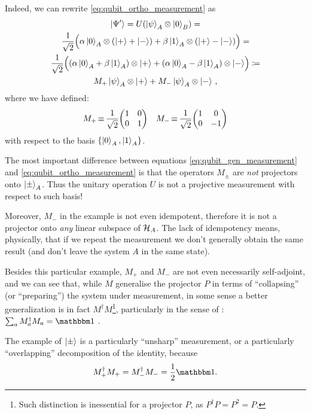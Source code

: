 Indeed, we can rewrite \eqref{eq:qubit_ortho_measurement} as
\begin{multline}\label{eq:qubit_gen_measurement}
  \ket{\Psi'}                                               =
  U( \ket{\psi}_A \otimes \ket{0}_B )                           =         \\
  \frac{1}{\sqrt{2}} \qty\Big(
    \alpha\ket{0}_A \otimes \qty(\ket{+}+\ket{-}) +
    \beta \ket{1}_A \otimes \qty(\ket{+}-\ket{-})
  )                                                         =         \\
  \frac{1}{\sqrt{2}} \qty\Big(
    \qty(\alpha\ket{0}_A + \beta\ket{1}_A) \otimes \ket{+} +
    \qty(\alpha\ket{0}_A - \beta\ket{1}_A) \otimes \ket{-}
  )                                               \coloneqq            \\
  M_+\ket{\psi}_A \otimes \ket{+} + M_-\ket{\psi}_A \otimes \ket{-}
  \,\text{,}
\end{multline}
where we have defined:
\begin{align*}
  &
  M_+ \repr \frac{1}{\sqrt{2}}\mqty(\imat{2})
  &
  M_- \repr \frac{1}{\sqrt{2}}\mqty(1& 0\\0& -1)
\end{align*}
with respect to the basis $\left\{\ket{0}_A, \ket{1}_A\right\}$.

The most important difference between equations \eqref{eq:qubit_gen_measurement}
and \eqref{eq:qubit_ortho_measurement} is that
the o\-per\-a\-tors $M_{\pm}$ are \emph{not} projectors onto $\ket{\pm}_A$.
Thus the unitary operation $U$ is not a projective measurement
with respect to such basis!

Moreover, $M_-$ in the example is not even idempotent,
therefore it is not a projector onto \emph{any} linear subspace of $\mathcal{H}_A$.
The lack of idempotency means, physically,
that if we repeat the measurement we don't generally
obtain the same result (and don't leave the system $A$ in the same state).

Besides this particular example, $M_+$ and $M_-$ are not even necessarily
self-adjoint, and we can see that, while $M$ generalise the projector $P$
in terms of ``collapsing'' (or ``preparing'') the system under measurement,
in some sense a better generalization is in fact $M^{\dagger}M$\footnote{
  Such distinction is inessential for a projector $P$,
  as $P^{\dagger}P = P^2 = P$.
}, particularly in the sense of :
$\sum_a M_a^{\dagger}M_a = \idop$ \parencite[sec.3.1]{PreskillNotes}.

The example of $\ket{\pm}$ is a particularly ``unsharp'' measurement,
or a particularly ``overlapping'' decomposition of the identity,
because
$$M_+^{\dagger}M_+ = M_-^{\dagger}M_- = \frac{1}{2}\idop\text{.}$$

